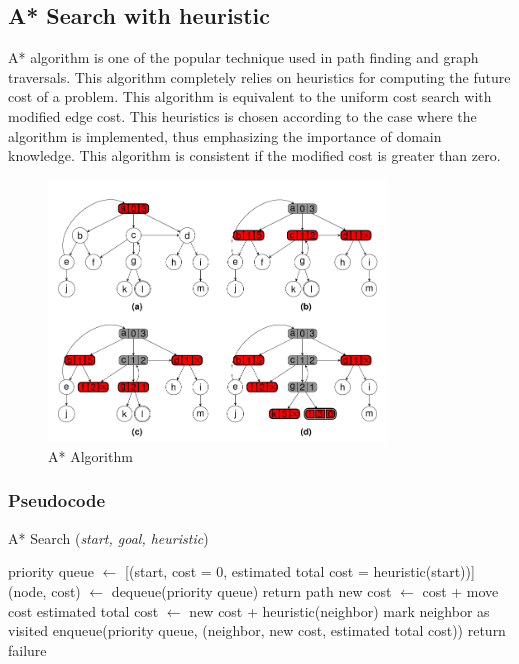 \subsection{A* Search with heuristic}
\noindent A* algorithm is one of the popular technique used in path finding and graph traversals. This algorithm completely relies on heuristics for computing the future cost of a problem. This algorithm is equivalent to the uniform cost search with modified edge cost. This heuristics is chosen according to the case where the algorithm is implemented, thus emphasizing the importance of domain knowledge. This algorithm is consistent if the modified cost is greater than zero.

\begin{figure}[H]
	\centering
	\includegraphics[width=0.8\textwidth]{./imgs/astar.png}
	\caption{A* Algorithm}
\end{figure}

\subsubsection{Pseudocode}
\begin{algorithm}[H]
	\caption{A* Search (\textit{start, goal, heuristic})}
	\label{alg:astar}
	\begin{algorithmic}[1]
	\State priority queue \(\gets\) [(start, cost = 0, estimated total cost = heuristic(start))]
		\State (node, cost) \(\gets\) dequeue(priority queue)
			\State return path
		\EndIf
			\State new cost \(\gets\) cost + move cost
			\State estimated total cost \(\gets\) new cost + heuristic(neighbor)
				\State mark neighbor as visited
				\State enqueue(priority queue, (neighbor, new cost, estimated total cost))
			\EndIf
		\EndFor
	\EndWhile
	\State return failure
	\end{algorithmic}
\end{algorithm}

